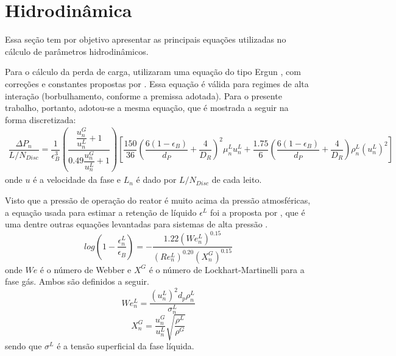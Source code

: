 
\section{Hidrodinâmica} \label{sec:hidrodinamica3}

Essa seção tem por objetivo apresentar as principais equações utilizadas no
cálculo de parâmetros hidrodinâmicos.

Para o cálculo da perda de carga,  utilizaram uma equação
do tipo Ergun , com correções e constantes propostas
por . Essa equação é válida para regimes de alta
interação (borbulhamento, conforme a premissa adotada). Para o presente
trabalho, portanto, adotou-se a mesma equação, que é mostrada a seguir na forma
discretizada:
\begin{equation}
\label{eq:deltaP}
\begin{split}
\dfrac{\Delta P_{n}}{L/N_{Disc}} = \dfrac{1}{\epsilon_B^{3}}
\left(\dfrac{\dfrac{u^{G}_{n}}{u^{L}_{n}} +
1}{\num{0,49}\dfrac{u^{G}_{n}}{u^{L}_{n}} + 1}\right)
\left[\dfrac{150}{36}\left(\dfrac{6(1-\epsilon_B)} {d_P}+\dfrac{4}{D_R}
\right)^2\mu^{L}_{n}u^{L}_{n} + \dfrac{\num{1,75}}{6}
\left(\dfrac{6(1-\epsilon_B)} {d_P} + \dfrac{4}{D_R}\right)
\rho^{L}_{n}(u^{L}_{n})^2 \right]
\end{split}
\end{equation}
onde $u$ é a velocidade da fase e $L_n$ é dado por $L/N_{Disc}$ de cada leito.


Visto que a pressão de operação do reator é muito acima da pressão atmosféricas,
a equação usada para estimar a retenção de líquido $\epsilon^L$ foi a proposta
por , que é uma dentre outras
equações levantadas para sistemas de alta pressão \cite{Ancheyta2011}.
\begin{equation}
log \left (1-\dfrac{\epsilon_{n}^L}{\epsilon_B} \right) =
-\dfrac{\num{1,22}(We_{n}^L)^{\num{0,15}}}{(Re_{n}^L)^{\num{0,20}}(X_{n}^G)^{\num{0,15}}}
\label{eq:epsilonL}
\end{equation}
onde $We$ é o número de Webber e $X^G$ é o número de Lockhart-Martinelli
para a fase gás. Ambos são definidos a seguir.
\begin{equation}
We_{n}^L = \dfrac{(u_{n}^L)^2d_p\rho_{n}^L}{\sigma_{n}^L}
\label{eq:webber}
\end{equation}
\begin{equation}
X_{n}^G = \dfrac{u_{n}^G}{u_n^L} \sqrt{\dfrac{\rho^L}{\rho^G}}
\label{eq:X}
\end{equation}
sendo que $\sigma^L$ é a tensão superficial da fase líquida.

